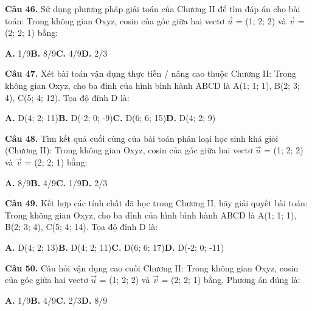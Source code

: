 \documentclass[11pt,a4paper]{article}
\begin{document}
\textbf{\color{primary} Câu 46.} Sử dụng phương pháp giải toán của Chương II để tìm đáp án cho bài toán: Trong không gian Oxyz, cosin của góc giữa hai vectơ $\vec{u}$ = (1; 2; 2) và $\vec{v}$ = (2; 2; 1) bằng:\par
\hspace*{1.5em}\textbf{A.} 1/9\quad\quad \textbf{B.} 8/9\quad\quad \textbf{C.} 4/9\quad\quad \textbf{D.} 2/3\par\vspace{2pt}
\textbf{\color{primary} Câu 47.} Xét bài toán vận dụng thực tiễn / nâng cao thuộc Chương II: Trong không gian Oxyz, cho ba đỉnh của hình bình hành ABCD là A(1; 1; 1), B(2; 3; 4), C(5; 4; 12). Tọa độ đỉnh D là:\par
\hspace*{1.5em}\textbf{A.} D(4; 2; 11)\quad\quad \textbf{B.} D(-2; 0; -9)\quad\quad \textbf{C.} D(6; 6; 15)\quad\quad \textbf{D.} D(4; 2; 9)\par\vspace{2pt}
\textbf{\color{primary} Câu 48.} Tìm kết quả cuối cùng của bài toán phân loại học sinh khá giỏi (Chương II): Trong không gian Oxyz, cosin của góc giữa hai vectơ $\vec{u}$ = (1; 2; 2) và $\vec{v}$ = (2; 2; 1) bằng:\par
\hspace*{1.5em}\textbf{A.} 8/9\quad\quad \textbf{B.} 4/9\quad\quad \textbf{C.} 1/9\quad\quad \textbf{D.} 2/3\par\vspace{2pt}
\textbf{\color{primary} Câu 49.} Kết hợp các tính chất đã học trong Chương II, hãy giải quyết bài toán: Trong không gian Oxyz, cho ba đỉnh của hình bình hành ABCD là A(1; 1; 1), B(2; 3; 4), C(5; 4; 14). Tọa độ đỉnh D là:\par
\hspace*{1.5em}\textbf{A.} D(4; 2; 13)\quad\quad \textbf{B.} D(4; 2; 11)\quad\quad \textbf{C.} D(6; 6; 17)\quad\quad \textbf{D.} D(-2; 0; -11)\par\vspace{2pt}
\textbf{\color{primary} Câu 50.} Câu hỏi vận dụng cao cuối Chương II: Trong không gian Oxyz, cosin của góc giữa hai vectơ $\vec{u}$ = (1; 2; 2) và $\vec{v}$ = (2; 2; 1) bằng. Phương án đúng là:\par
\hspace*{1.5em}\textbf{A.} 1/9\quad\quad \textbf{B.} 4/9\quad\quad \textbf{C.} 2/3\quad\quad \textbf{D.} 8/9\par\vspace{2pt}
\end{document}
